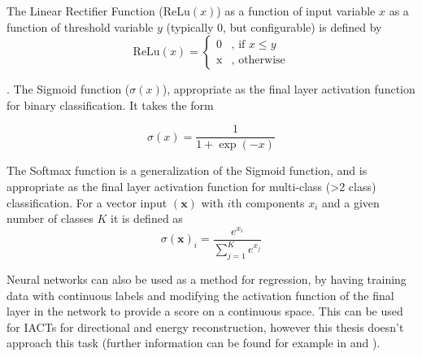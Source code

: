 The Linear Rectifier Function ($\textrm{ReLu}(x)$) as a function of input variable $x$ as a function of threshold variable $y$ (typically 0, but configurable) is defined by
\begin{equation}
    \textrm{ReLu}(x)=\begin{cases}\mbox{0} & \mbox{, if } x \leq y \\ \mbox{x} & \mbox{, otherwise} \end{cases}
\end{equation}

\cite{Keras}. The Sigmoid function ($\sigma(x)$), appropriate as the final layer activation function for binary classification. It takes the form

\begin{equation}
    \sigma(x)=\frac{1}{1+\exp(-x)}
\end{equation}

The Softmax function is a generalization of the Sigmoid function, and is appropriate as the final layer activation function for multi-class (>2 class) classification. For a vector input $(\textbf{x})$ with $i$th components $x_i $ and a given number of classes $K$ it is defined as
\begin{equation}
    \sigma(\textbf{x})_i=\frac{e^{x_i}}{\sum_{j=1}^K e^{x_j}}
\end{equation}

Neural networks can also be used as a method for regression, by having training data with continuous labels and modifying the activation function of the final layer in the network to provide a score on a continuous space. This can be used for IACTs for directional and energy reconstruction, however this thesis doesn't approach this task (further information can be found for example in \cite{mikaelphd} and \cite{tjarkicrc}).  

